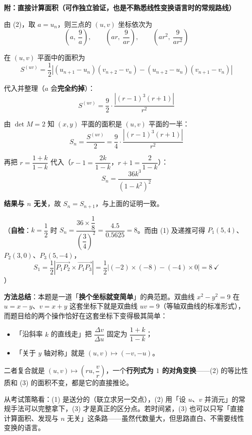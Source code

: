 \par\medskip

\textbf{附：直接计算面积（可作独立验证，也是不熟悉线性变换语言时的常规路线）}

由 (2)，取 $a=u_n$，则三点的 $(u,v)$ 坐标依次为
\[\left(a,\ \frac9a\right),\qquad\left(ar,\ \frac9{ar}\right),\qquad\left(ar^{2},\ \frac9{ar^{2}}\right)\]

在 $(u,v)$ 平面中的面积为
\[S^{(uv)}=\frac12\left|\left(u_{n+1}-u_n\right)\left(v_{n+2}-v_n\right)-\left(u_{n+2}-u_n\right)\left(v_{n+1}-v_n\right)\right|\]

代入并整理（$a$ 会\textbf{完全约掉}）：
\[S^{(uv)}=\frac92\cdot\frac{\left|(r-1)^{3}(r+1)\right|}{r^{2}}\]

由 $\det M=2$ 知 $(x,y)$ 平面的面积是 $(u,v)$ 平面的一半：
\[S_n=\frac{S^{(uv)}}2=\frac94\cdot\frac{\left|(r-1)^{3}(r+1)\right|}{r^{2}}\]

再把 $r=\dfrac{1+k}{1-k}$ 代入（$r-1=\dfrac{2k}{1-k}$，$r+1=\dfrac2{1-k}$）：
\[S_n=\frac{36k^{3}}{\left(1-k^{2}\right)^{2}}\]

\textbf{结果与 $n$ 无关}，故 $S_n=S_{n+1}$，与上面的证明一致。

（\textbf{自检}：$k=\dfrac12$ 时 $S_n=\dfrac{36\times\dfrac18}{\left(\dfrac34\right)^{2}}=\dfrac{4.5}{0.5625}=8$。而由 (1) 及递推可得 $P_1(5,4)$、$P_2(3,0)$、$P_3(5,-4)$，
\[S_1=\frac12\left|\overrightarrow{P_1P_2}\times\overrightarrow{P_1P_3}\right|=\frac12\left|(-2)\times(-8)-(-4)\times0\right|=8\ \checkmark\]
）

\begin{gktip}
\textbf{方法总结}：本题是一道「\textbf{换个坐标就变简单}」的典范题。双曲线 $x^{2}-y^{2}=9$ 在 $u=x-y$、$v=x+y$ 这套坐标下就是双曲线 $uv=9$（等轴双曲线的标准形式），而题目给的两个操作恰好在这套坐标下变得极其简单：
\begin{itemize}
\item 「沿斜率 $k$ 的直线走」把 $\dfrac{\Delta v}{\Delta u}$ 固定为 $\dfrac{1+k}{1-k}$；
\item 「关于 $y$ 轴对称」就是 $(u,v)\mapsto(-v,-u)$。
\end{itemize}

二者复合就是 $(u,v)\mapsto\left(ru,\dfrac vr\right)$，一个\textbf{行列式为 $1$ 的对角变换}——(2) 的等比性质和 (3) 的面积不变，都是它的直接推论。

从考试策略看：(1) 是送分的（联立求另一交点），(2) 用「设 $u$、$v$ 并消元」的常规手法可以完整拿下，(3) 才是真正的区分点。若时间紧，(3) 也可以只写「直接计算面积、发现与 $n$ 无关」这条路——虽然代数量大，但思路直白、不需要线性变换的语言。
\end{gktip}
